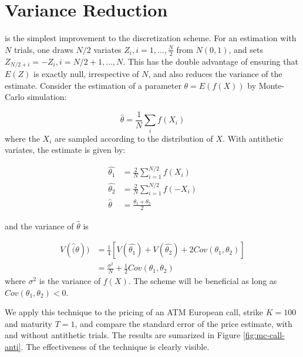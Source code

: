 \documentclass[12pt,]{tufte-book}
\begin{document}
\hypertarget{variance-reduction}{%
\section{Variance Reduction}\label{variance-reduction}}

 is the simplest improvement to the discretization scheme. For an estimation with \(N\) trials, one draws \(N/2\) variates \(Z_i, i=1, \ldots, \frac{N}{2}\) from \(N(0,1)\), and sets \(Z_{N/2+i} = -Z_i, i=N/2+1, \ldots, N\). This has the double advantage of ensuring that \(E(Z)\) is exactly null, irrespective of \(N\), and also reduces the variance of the estimate. Consider the estimation of a parameter \(\theta = E(f(X))\) by Monte-Carlo simulation:

\[
\hat{\theta} = \frac{1}{N} \sum_i f(X_i)
\]
where the \(X_i\) are sampled according to the distribution of \(X\). With antithetic variates, the estimate is given by:

\begin{align}
\hat{\theta_1} &= \frac{2}{N} \sum_{i=1}^{N/2} f(X_i) \\
\hat{\theta_2} &= \frac{2}{N} \sum_{i=1}^{N/2} f(-X_i) \\
\hat{\theta} &= \frac{\theta_1 + \theta_2}{2}
\end{align}

and the variance of \(\hat{\theta}\) is

\begin{align}
V(\hat(\theta)) &= \frac{1}{4} \left[ V(\hat{\theta_1}) + V(\hat{\theta_2}) + 2 Cov(\theta_1, \theta_2) \right] \\
&= \frac{\sigma^2}{N} + \frac{1}{2} Cov(\theta_1, \theta_2)
\end{align}
where \(\sigma^2\) is the variance of \(f(X)\). The scheme will be beneficial as long as \(Cov(\theta_1, \theta_2) < 0\).

We apply this technique to the pricing of an ATM European call, strike \(K=100\) and maturity \(T=1\), and compare the standard error of the price estimate, with and without antithetic trials. The results are sumarized in Figure \ref{fig:mc-call-anti}. The effectiveness of the technique is clearly visible.
\end{document}
